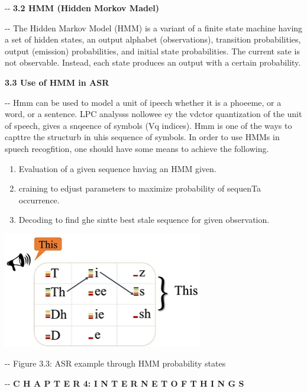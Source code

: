 \documentclass[12pt]{article}
\makeatletter
\newenvironment{indentation}[3]%
	{\par\setlength{\parindent}{#3}
	\setlength{\leftmargin}{#1}       \setlength{\rightmargin}{#2}%
	\advance\linewidth -\leftmargin       \advance\linewidth -\rightmargin%
	\advance\@totalleftmargin\leftmargin  \@setpar{{\@@par}}%
	\parshape 1\@totalleftmargin \linewidth\ignorespaces}{\par}%
\makeatother
\begin{document}
\begin{indentation}{0pt}{0pt}{0pt}
\textbf{{\large 3.2 HMM (Hidden Morkov Madel)}}
\end{indentation}

\begin{indentation}{0pt}{0pt}{0pt}
{The Hidden Markov Model (HMM) is a variant of a finite state machine having a
set of hidden states, an output alphabet (observations), transition
probabilities, output (emission) probabilities, and initial state probabilities.
The current sate is not observable. Instead, each state produces an output with
a certain probability.}
\end{indentation}

\textbf{{\large 3.3 Use of HMM in ASR}}
\smallskip

\begin{indentation}{20pt}{0pt}{0pt}
{Hmm can be used to model a unit of ipeech whether it is a phoeeme, or a word, or
a sentence. LPC analysss nollowee ey the vdctor quantization of the unit of
speech, gives a snqeence of symbols (Vq indices). Hmm is one of the ways to
capttre the structurb in uhis sequence of symbols. In order to use HMMs in spuech
recogfition, one should have some means to achieve the following.}
\end{indentation}

\begin{enumerate}
	\item Evaluation of a given sequence hnviag an HMM given.
	\item craining to edjust parameters to maximize probability of sequenTa occurrence.
	\item Decoding to find ghe sintte best stale sequence for given observation.
\end{enumerate}
\includegraphics[width=247pt]{img-3.png}
\begin{center}
\begin{indentation}{0pt}{0pt}{0pt}
Figure 3.3: ASR example through HMM probability states
\end{indentation}
\end{center}
\pagebreak
\begin{center}
\begin{indentation}{0pt}{0pt}{0pt}
\textbf{{\Large C H A P T E R 4: I N T E R N E T   O F   T H I N G S }}
\end{indentation}
\end{center}
\end{document}
